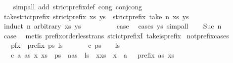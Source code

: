 \begin{isabellebody}
%
\isadelimproof
\ \ %
\endisadelimproof
%
\isatagproof
{}\isamarkupfalse%
\ {\isacharparenleft}simp{\isacharunderscore}all\ add{\isacharcolon}\ strict{\isacharunderscore}prefix{\isacharunderscore}def\ cong{\isacharcolon}\ conj{\isacharunderscore}cong{\isacharparenright}%
\endisatagproof
{\isafoldproof}%
%
\isadelimproof
\isanewline
%
\endisadelimproof
\isanewline
{}\isamarkupfalse%
\ take{\isacharunderscore}strict{\isacharunderscore}prefix{\isacharcolon}\ {\isachardoublequoteopen}strict{\isacharunderscore}prefix\ xs\ ys\ {\isasymLongrightarrow}\ strict{\isacharunderscore}prefix\ {\isacharparenleft}take\ n\ xs{\isacharparenright}\ ys{\isachardoublequoteclose}\isanewline
%
\isadelimproof
%
\endisadelimproof
%
\isatagproof
{}\isamarkupfalse%
\ {\isacharparenleft}induct\ n\ arbitrary{\isacharcolon}\ xs\ ys{\isacharparenright}\isanewline
\ \ \isamarkupfalse%
\ {}\isanewline
\ \ \isamarkupfalse%
\ \isamarkupfalse%
\ {\isacharquery}case\ \isamarkupfalse%
\ {\isacharparenleft}cases\ ys{\isacharparenright}\ simp{\isacharunderscore}all\isanewline
{}\isamarkupfalse%
\isanewline
\ \ \isamarkupfalse%
\ {\isacharparenleft}Suc\ n{\isacharparenright}\isanewline
\ \ \isamarkupfalse%
\ \isamarkupfalse%
\ {\isacharquery}case\ \isamarkupfalse%
\ {\isacharparenleft}metis\ prefix{\isacharunderscore}order{\isachardot}less{\isacharunderscore}trans\ strict{\isacharunderscore}prefixI\ take{\isacharunderscore}is{\isacharunderscore}prefix{\isacharparenright}\isanewline
{}\isamarkupfalse%
%
\endisatagproof
{\isafoldproof}%
%
\isadelimproof
\isanewline
%
\endisadelimproof
\isanewline
{}\isamarkupfalse%
\ not{\isacharunderscore}prefix{\isacharunderscore}cases{\isacharcolon}\isanewline
\ \ \ pfx{\isacharcolon}\ {\isachardoublequoteopen}{\isasymnot}\ prefix\ ps\ ls{\isachardoublequoteclose}\isanewline
\ \ \isanewline
\ \ \ \ {\isacharparenleft}c{}{\isacharparenright}\ {\isachardoublequoteopen}ps\ {\isasymnoteq}\ {\isacharbrackleft}{\isacharbrackright}{\isachardoublequoteclose}\ \ {\isachardoublequoteopen}ls\ {\isacharequal}\ {\isacharbrackleft}{\isacharbrackright}{\isachardoublequoteclose}\isanewline
\ \ {\isacharbar}\ {\isacharparenleft}c{}{\isacharparenright}\ a\ as\ x\ xs\ \ {\isachardoublequoteopen}ps\ {\isacharequal}\ a{\isacharhash}as{\isachardoublequoteclose}\ \ {\isachardoublequoteopen}ls\ {\isacharequal}\ x{\isacharhash}xs{\isachardoublequoteclose}\ \ {\isachardoublequoteopen}x\ {\isacharequal}\ a{\isachardoublequoteclose}\ \ {\isachardoublequoteopen}{\isasymnot}\ prefix\ as\ xs{\isachardoublequoteclose}\isanewline

\end{isabellebody}
